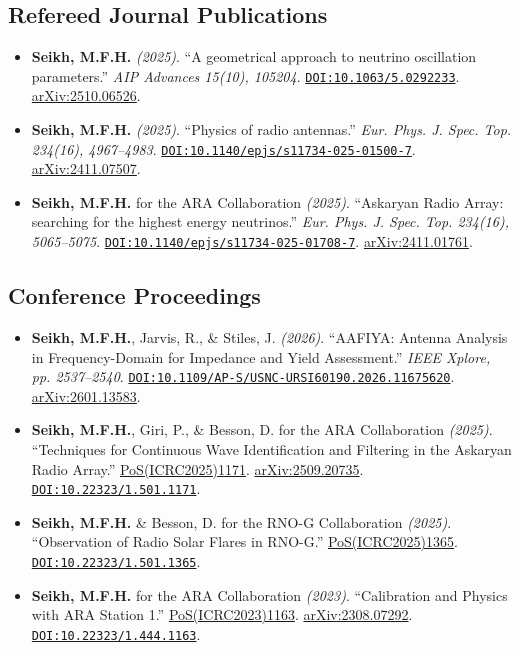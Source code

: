 \documentclass[10pt]{article}
\newcommand{\doi}[1]{{\urlstyle{tt}\href{https://doi.org/#1}{\nolinkurl{DOI:#1}}}.}
\newcommand{\arxiv}[1]{\href{https://arxiv.org/abs/#1}{arXiv:#1}.}
\begin{document}
\subsection{Refereed Journal Publications}
\begin{itemize}
    \item \textbf{Seikh, M.F.H.} \textit{(2025)}. ``A geometrical approach to neutrino oscillation parameters.'' \textit{AIP Advances 15(10), 105204}. \doi{10.1063/5.0292233} \arxiv{2510.06526}
    \item \textbf{Seikh, M.F.H.} \textit{(2025)}. ``Physics of radio antennas.'' \textit{Eur. Phys. J. Spec. Top. 234(16), 4967--4983}. \doi{10.1140/epjs/s11734-025-01500-7} \arxiv{2411.07507}
    \item \textbf{Seikh, M.F.H.} for the ARA Collaboration \textit{(2025)}. ``Askaryan Radio Array: searching for the highest energy neutrinos.'' \textit{Eur. Phys. J. Spec. Top. 234(16), 5065--5075}. \doi{10.1140/epjs/s11734-025-01708-7} \arxiv{2411.01761}
\end{itemize}

\subsection{Conference Proceedings}
\begin{itemize}
\sloppy
    \item \textbf{Seikh, M.F.H.}, Jarvis, R., \& Stiles, J. \textit{(2026)}. ``AAFIYA: Antenna Analysis in Frequency-Domain for Impedance and Yield Assessment.'' \textit{IEEE Xplore, pp. 2537--2540}. \doi{10.1109/AP-S/USNC-URSI60190.2026.11675620} \arxiv{2601.13583}
    \item \textbf{Seikh, M.F.H.}, Giri, P., \& Besson, D. for the ARA Collaboration \textit{(2025)}. ``Techniques for Continuous Wave Identification and Filtering in the Askaryan Radio Array.'' \href{https://pos.sissa.it/501/1171/pdf}{PoS(ICRC2025)1171}. \arxiv{2509.20735} \doi{10.22323/1.501.1171}
    \item \textbf{Seikh, M.F.H.} \& Besson, D. for the RNO-G Collaboration \textit{(2025)}. ``Observation of Radio Solar Flares in RNO-G.'' \href{https://pos.sissa.it/501/1365/pdf}{PoS(ICRC2025)1365}. \doi{10.22323/1.501.1365}
    \item \textbf{Seikh, M.F.H.} for the ARA Collaboration \textit{(2023)}. ``Calibration and Physics with ARA Station 1.'' \href{https://pos.sissa.it/444/1163/}{PoS(ICRC2023)1163}. \arxiv{2308.07292} \doi{10.22323/1.444.1163}
\end{itemize}
\end{document}
